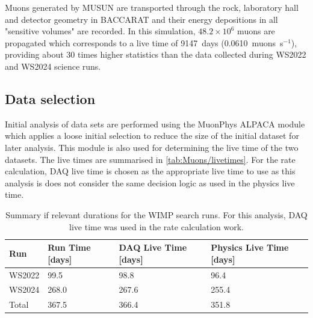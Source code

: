 Muons generated by MUSUN are transported through the rock, laboratory hall and detector geometry in BACCARAT and their energy depositions in all "sensitive volumes" are recorded. In this simulation, $48.2\times10^6$ muons are propagated which corresponds to a live time of 9147~days (0.0610~muons~s$^{-1}$), providing about 30 times higher statistics than the data collected during WS2022 and WS2024 science runs.

\subsection{Data selection}\label{sec:Muons/MuonFluxDataSelection}
Initial analysis of data sets are performed using the {\selectfont MuonPhys} ALPACA module which applies a loose initial selection to reduce the size of the initial dataset for later analysis. This module is also used for determining the live time of the two datasets. The live times are summarised in \autoref{tab:Muons/livetimes}. For the rate calculation, DAQ live time is chosen as the appropriate live time to use as this analysis is does not consider the same decision logic as used in the physics live time.
\begin{table}[h!]
    \centering
    \caption[Summary if relevant durations for the WIMP search runs.]{Summary if relevant durations for the WIMP search runs. For this analysis, DAQ live time was used in the rate calculation work.}
    \label{tab:Muons/livetimes}
    \begin{tabular}{llll}
        \hline\hline
        \textbf{Run} & \textbf{Run Time [days]} & \textbf{DAQ Live Time [days]} & \textbf{Physics Live Time [days]} \\
        \hline
        WS2022 & 99.5 & 98.8 & 96.4 \\
        WS2024 & 268.0 & 267.6 & 255.4 \\
        Total & 367.5 & 366.4 & 351.8 \\
        \hline\hline
    \end{tabular}
\end{table}
